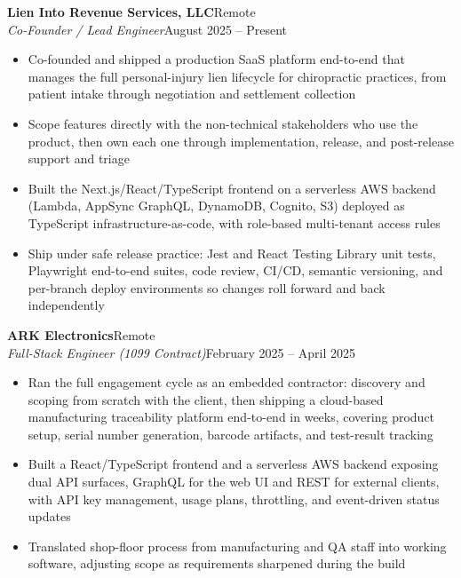 \documentclass[10.5pt, letterpaper]{article}
\newcommand{\jobentry}[4]{%
  \noindent
  \textbf{\color{accent}#1}\hfill\textcolor{muted}{\small #2}\\
  \textit{#3}\hfill\textcolor{muted}{\small #4}%
}
\begin{document}
\jobentry{Lien Into Revenue Services, LLC}{Remote}{Co-Founder / Lead Engineer}{August 2025 -- Present}
\begin{itemize}
  \item Co-founded and shipped a production SaaS platform end-to-end that manages the
        full personal-injury lien lifecycle for chiropractic practices, from patient
        intake through negotiation and settlement collection
  \item Scope features directly with the non-technical stakeholders who use the
        product, then own each one through implementation, release, and post-release
        support and triage
  \item Built the Next.js/React/TypeScript frontend on a serverless AWS backend
        (Lambda, AppSync GraphQL, DynamoDB, Cognito, S3) deployed as TypeScript
        infrastructure-as-code, with role-based multi-tenant access rules
  \item Ship under safe release practice: Jest and React Testing Library unit tests,
        Playwright end-to-end suites, code review, CI/CD, semantic versioning, and
        per-branch deploy environments so changes roll forward and back independently
\end{itemize}

\vspace{3pt}

\jobentry{ARK Electronics}{Remote}{Full-Stack Engineer \normalfont\small(1099 Contract)}{February 2025 -- April 2025}
\begin{itemize}
  \item Ran the full engagement cycle as an embedded contractor: discovery and scoping
        from scratch with the client, then shipping a cloud-based manufacturing
        traceability platform end-to-end in weeks, covering product setup, serial
        number generation, barcode artifacts, and test-result tracking
  \item Built a React/TypeScript frontend and a serverless AWS backend exposing dual
        API surfaces, GraphQL for the web UI and REST for external clients, with API
        key management, usage plans, throttling, and event-driven status updates
  \item Translated shop-floor process from manufacturing and QA staff into working
        software, adjusting scope as requirements sharpened during the build
\end{itemize}

\vspace{3pt}
\end{document}
